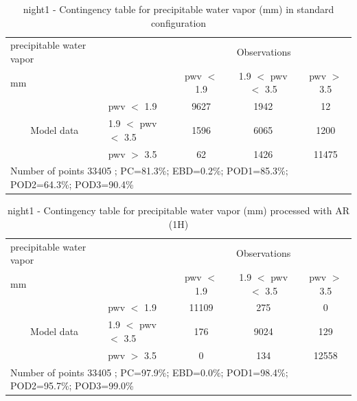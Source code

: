 \begin{table}[p!]
\begin{center}
\begin{tabular}{llccc}
\hline
{precipitable water vapor}                                       &                                                    & \multicolumn{3}{c}{Observations}                 \\
{mm}                                       &                             & pwv $<$ 1.9   & 1.9 $<$ pwv $<$ 3.5 & pwv $>$ 3.5 \\
\hline
\multicolumn{1}{c}{\multirow{3}{*}{Model data}}  & pwv $<$ 1.9             & 9627                & 1942                       & 12              \\
                                                 & 1.9  $<$ pwv $<$ 3.5 & 1596                & 6065                       & 1200              \\
                                                 & pwv $>$ 3.5             & 62                & 1426                       & 11475              \\
\hline
\multicolumn{5}{l}{ Number of points        33405 ; PC=81.3\%; EBD=0.2\%; POD1=85.3\%; POD2=64.3\%; POD3=90.4\%}                 \\
\end{tabular}
\end{center}
\caption{night1 - Contingency table for  precipitable water vapor (mm) in standard configuration  }
\label{tab:contingencypwvBEF:night1}
\end{table}
\begin{table}[p!]
\begin{center}
\begin{tabular}{llccc}
\hline
{precipitable water vapor}                                       &                                                    & \multicolumn{3}{c}{Observations}                 \\
{mm}                                       &                             & pwv $<$ 1.9   & 1.9 $<$ pwv $<$ 3.5 & pwv $>$ 3.5 \\
\hline
\multicolumn{1}{c}{\multirow{3}{*}{Model data}}  & pwv $<$ 1.9             & 11109                & 275                       & 0              \\
                                                 & 1.9  $<$ pwv $<$ 3.5 & 176                & 9024                       & 129              \\
                                                 & pwv $>$ 3.5             & 0                & 134                       & 12558              \\
\hline 
\multicolumn{5}{l}{ Number of points        33405 ; PC=97.9\%; EBD=0.0\%; POD1=98.4\%; POD2=95.7\%; POD3=99.0\%}
\end{tabular}
\end{center}
\caption{night1 - Contingency table for  precipitable water vapor (mm) processed with AR (1H)  }
\label{tab:contingencypwvAFT:night1}
\end{table}
